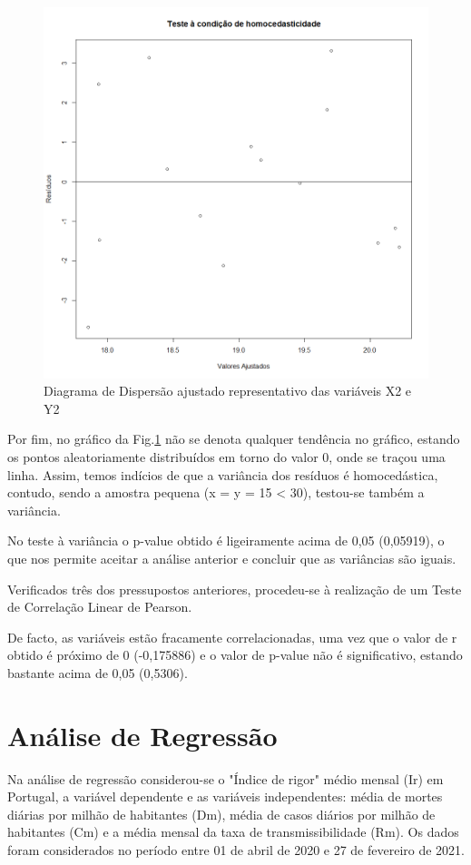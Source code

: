 \documentclass[conference]{IEEEtran}
\begin{document}
\begin{figure}[htbp]
\centerline{\includegraphics[width=0.95\columnwidth]{images/03.b.4.png}}
\caption{Diagrama de Dispersão ajustado representativo das variáveis X2 e Y2}
\label{3b4}
\end{figure}

Por fim, no gráfico da Fig.\ref{3b4} não se denota qualquer tendência no gráfico, estando os pontos aleatoriamente distribuídos em torno do valor 0, onde se traçou uma linha. Assim, temos indícios de que a variância dos resíduos é homocedástica, contudo, sendo a amostra pequena (x = y = 15 < 30), testou-se também a variância.

No teste à variância o p-value obtido é ligeiramente acima de 0,05 (0,05919), o que nos permite aceitar a análise anterior e concluir que as variâncias são iguais.


Verificados três dos pressupostos anteriores, procedeu-se à realização de um Teste de Correlação Linear de Pearson.

De facto, as variáveis estão fracamente correlacionadas, uma vez que o valor de r obtido é próximo de 0 (-0,175886) e o valor de p-value não é significativo, estando bastante acima de 0,05 (0,5306).


\section{Análise de Regressão} %
Na análise de regressão considerou-se o "Índice de rigor" médio mensal (Ir) em Portugal, a variável dependente e as variáveis independentes: média de mortes diárias por milhão de habitantes (Dm), média de casos diários por milhão de habitantes (Cm) e a média mensal da taxa de transmissibilidade (Rm). Os dados foram considerados no período entre 01 de abril de 2020 e 27 de fevereiro de 2021.
\end{document}

